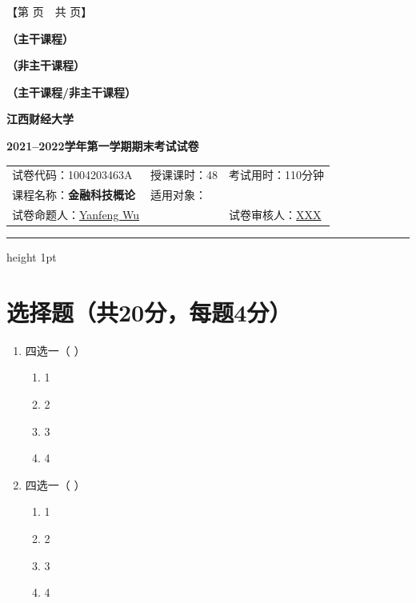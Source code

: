 \documentclass{ctexart}
\begin{document}
\begin{center}
    【第 \thepage 页~~共 \pageref{LastPage} 页】
\end{center}

\begin{center}
\textbf{（主干课程）}

\textbf{（非主干课程）}

\textbf{（主干课程/非主干课程）}
\end{center}
\vspace{1em}
\begin{center}
\textbf{\LARGE 江西财经大学}\par
\vspace{8pt}
\textbf{\LARGE 2021--2022学年第一学期期末考试试卷}
\end{center}

\begin{center}
\begin{tabular}{m{} m{} m{}}
     试卷代码：1004203463A &授课课时：48 &考试用时：110分钟 \\
     课程名称：\textbf{金融科技概论} 
     & \multicolumn{2}{l}{适用对象：}\\
     试卷命题人：\underline{Yanfeng Wu} &           &试卷审核人：\underline{XXX}
\end{tabular}
\end{center}
\hrule height 1pt

\section{选择题（共20分，每题4分）}
\begin{enumerate}
    \item 四选一（ ）
    \begin{enumerate}
        \item 1
        \item 2
        \item 3
        \item 4
    \end{enumerate}
    
    \item 四选一（ ）
    \begin{enumerate}
        \item 1
        \item 2
        \item 3
        \item 4
    \end{enumerate}
\end{enumerate}
\end{document}

